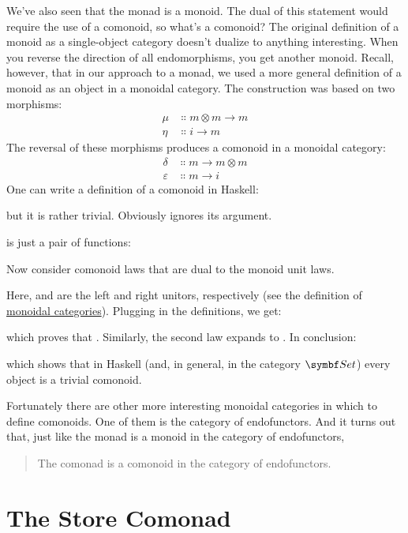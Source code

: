 We've also seen that the monad is a monoid. The dual of this statement
would require the use of a comonoid, so what's a comonoid? The original
definition of a monoid as a single-object category doesn't dualize to
anything interesting. When you reverse the direction of all
endomorphisms, you get another monoid. Recall, however, that in our
approach to a monad, we used a more general definition of a monoid as an
object in a monoidal category. The construction was based on two
morphisms:
\begin{align*}
  \mu  & \Colon m \otimes m \to m \\
  \eta & \Colon i \to m
\end{align*}
The reversal of these morphisms produces a comonoid in a monoidal
category:
\begin{align*}
  \delta      & \Colon m \to m \otimes m \\
  \varepsilon & \Colon m \to i
\end{align*}
One can write a definition of a comonoid in Haskell:

but it is rather trivial. Obviously  ignores its
argument.

 is just a pair of functions:

Now consider comonoid laws that are dual to the monoid unit laws.

Here,  and  are the left and right unitors,
respectively (see the definition of
\hyperref[monads-categorically]{monoidal
  categories}). Plugging in the definitions, we get:

which proves that . Similarly, the second law expands
to . In conclusion:

which shows that in Haskell (and, in general, in the category
$\Set$) every object is a trivial comonoid.

Fortunately there are other more interesting monoidal categories in
which to define comonoids. One of them is the category of endofunctors.
And it turns out that, just like the monad is a monoid in the category
of endofunctors,

\begin{quote}
  The comonad is a comonoid in the category of endofunctors.
\end{quote}

\section{The Store Comonad}

